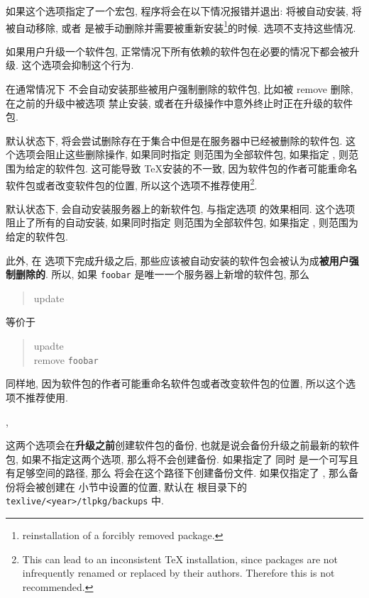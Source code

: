 \begin{description}
    如果这个选项指定了一个宏包, 程序将会在以下情况报错并退出:  将被自动安装,  将被自动移除, 或者  是被手动删除并需要被重新安装\footnote{reinstallation of a forcibly removed package.}的时候.  选项不支持这些情况. 
    \item {}\par
    如果用户升级一个软件包, 正常情况下所有依赖的软件包在必要的情况下都会被升级. 这个选项会抑制这个行为. 
    \item \hypertarget{op:-reinstall-forcibly-removed}{}\par
    在通常情况下 \tlmgr 不会自动安装那些被用户强制删除的软件包, 比如被 \ac{remove}  删除, 在之前的升级中被选项  禁止安装, 或者在升级操作中意外终止时正在升级的软件包. 
    \item {} \par
    默认状态下, \tlmgr 将会尝试删除存在于集合中但是在服务器中已经被删除的软件包. 这个选项会阻止这些删除操作, 如果同时指定  则范围为全部软件包, 如果指定 , 则范围为给定的软件包. 这可能导致 \TeX 安装的不一致, 因为软件包的作者可能重命名软件包或者改变软件包的位置, 所以这个选项不推荐使用\footnote{This can lead to an inconsistent TeX installation, since packages are not infrequently renamed or replaced by their authors. Therefore this is not recommended.}.
    \item {} \par
    默认状态下, \tlmgr 会自动安装服务器上的新软件包, 与指定选项  的效果相同. 这个选项阻止了所有的自动安装, 如果同时指定  则范围为全部软件包, 如果指定 , 则范围为给定的软件包.

    此外, 在  选项下完成升级之后, 那些应该被自动安装的软件包会被认为成\textbf{被用户强制删除的}. 所以, 如果 \texttt{foobar} 是唯一一个服务器上新增的软件包, 那么
    \begin{quote}
        \tlmgr{} \ac{update}  
    \end{quote}
    等价于
    \begin{quote}
        \tlmgr{} \ac{upadte} \\
        \tlmgr{} \ac{remove}  \texttt{foobar}
    \end{quote}
    同样地, 因为软件包的作者可能重命名软件包或者改变软件包的位置, 所以这个选项不推荐使用. 
    \item \hypertarget{op:backup}{,  }\par
    这两个选项会在\textbf{升级之前}创建软件包的备份, 也就是说会备份升级之前最新的软件包, 如果不指定这两个选项, 那么将不会创建备份. 如果指定了  同时  是一个可写且有足够空间的路径, 那么 \tlmgr 将会在这个路径下创建备份文件. 如果仅指定了 , 那么备份将会被创建在  小节中设置的位置, 默认在 \tl 根目录下的 \texttt{texlive/<year>/tlpkg/backups} 中.  


\end{description}
